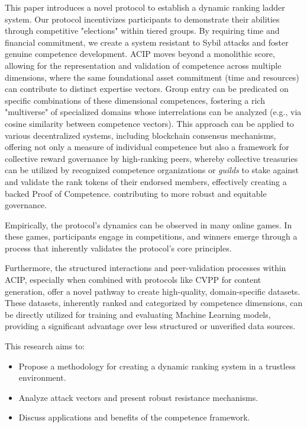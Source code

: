 \documentclass{article}
\begin{document}
\begin{CJK}{UTF8}{gbsn}
    This paper introduces a novel protocol to establish a dynamic ranking ladder system. Our protocol incentivizes participants to demonstrate their abilities through competitive "elections" within tiered groups. By requiring time and financial commitment, we create a system resistant to Sybil attacks and foster genuine competence development. ACIP moves beyond a monolithic score, allowing for the representation and validation of competence across multiple dimensions, where the same foundational asset commitment (time and resources) can contribute to distinct expertise vectors. Group entry can be predicated on specific combinations of these dimensional competences, fostering a rich "multiverse" of specialized domains whose interrelations can be analyzed (e.g., via cosine similarity between competence vectors). This approach can be applied to various decentralized systems, including blockchain consensus mechanisms, offering not only a measure of individual competence but also a framework for collective reward governance by high-ranking peers, whereby collective treasuries can be utilized by recognized competence organizations or \textit{guilds} to stake against and validate the rank tokens of their endorsed members, effectively creating a backed Proof of Competence. contributing to more robust and equitable governance.

    Empirically, the protocol's dynamics can be observed in many online games. In these games, participants engage in competitions, and winners emerge through a process that inherently validates the protocol's core principles.

        {{Furthermore, the structured interactions and peer-validation processes within ACIP, especially when combined with protocols like CVPP \cite{cvpp} for content generation, offer a novel pathway to create high-quality, domain-specific datasets. These datasets, inherently ranked and categorized by competence dimensions, can be directly utilized for training and evaluating Machine Learning models, providing a significant advantage over less structured or unverified data sources.}}

    This research aims to:

    \begin{itemize}[nosep]
        \item Propose a methodology for creating a dynamic ranking system in a trustless environment.
        \item Analyze attack vectors and present robust resistance mechanisms.
        \item Discuss applications and benefits of the competence framework.
    \end{itemize}


\end{CJK}
\end{document}
